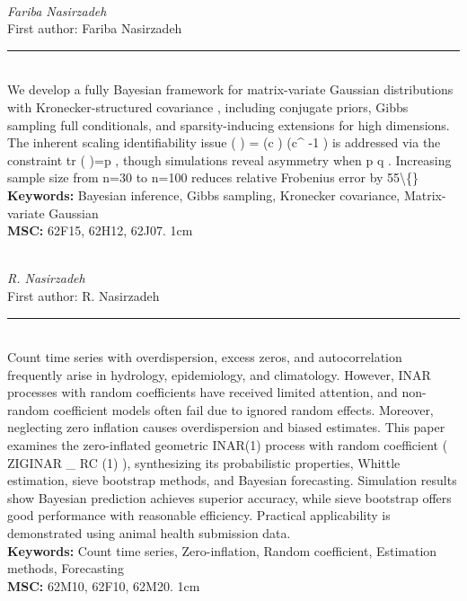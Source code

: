 \documentclass[10pt,twoside]{article}
\begin{document}
\noindent\begin{minipage}[t][\textheight]{\textwidth}
\\[0.35em]
{\itshape Fariba Nasirzadeh}\\[0.2em]
{\footnotesize First author: Fariba Nasirzadeh}\\[0.45em]
\noindent\rule{\textwidth}{0.3pt}\\[0.4em]
{\footnotesize  We develop a fully Bayesian framework for matrix-variate Gaussian distributions with Kronecker-structured covariance , including conjugate priors, Gibbs sampling full conditionals, and sparsity-inducing extensions for high dimensions. The inherent scaling identifiability issue ( ) = (c ) (c\textasciicircum{} -1 ) is addressed via the constraint tr ( )=p , though simulations reveal asymmetry when p q . Increasing sample size from n=30 to n=100 reduces relative Frobenius error by 55\textbackslash\{\}}\\[0.4em]
{\footnotesize\bfseries Keywords:} {\footnotesize Bayesian inference, Gibbs sampling, Kronecker covariance, Matrix-variate Gaussian}\\[0.15em]
{\footnotesize\bfseries MSC:} {\footnotesize 62F15, 62H12, 62J07. 1cm}\\
\vfill
\end{minipage}
\newpage

\noindent\begin{minipage}[t][\textheight]{\textwidth}
\\[0.35em]
{\itshape R. Nasirzadeh}\\[0.2em]
{\footnotesize First author: R. Nasirzadeh}\\[0.45em]
\noindent\rule{\textwidth}{0.3pt}\\[0.4em]
{\footnotesize  Count time series with overdispersion, excess zeros, and autocorrelation frequently arise in hydrology, epidemiology, and climatology. However, INAR processes with random coefficients have received limited attention, and non-random coefficient models often fail due to ignored random effects. Moreover, neglecting zero inflation causes overdispersion and biased estimates. This paper examines the zero-inflated geometric INAR(1) process with random coefficient ( ZIGINAR \_ RC (1) ), synthesizing its probabilistic properties, Whittle estimation, sieve bootstrap methods, and Bayesian forecasting. Simulation results show Bayesian prediction achieves superior accuracy, while sieve bootstrap offers good performance with reasonable efficiency. Practical applicability is demonstrated using animal health submission data.}\\[0.4em]
{\footnotesize\bfseries Keywords:} {\footnotesize Count time series, Zero-inflation, Random coefficient, Estimation methods, Forecasting}\\[0.15em]
{\footnotesize\bfseries MSC:} {\footnotesize 62M10, 62F10, 62M20. 1cm}\\
\vfill
\end{minipage}
\newpage
\end{document}
